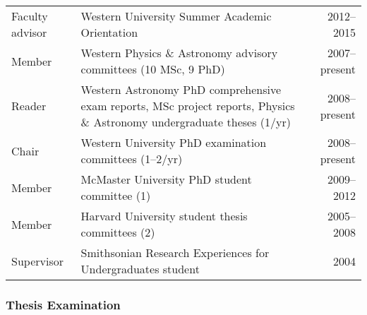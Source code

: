 \begin{tabularx}{\textwidth}{lXr}
Faculty advisor& Western University Summer Academic Orientation & 2012--2015\\
Member &Western Physics \& Astronomy advisory committees (10 MSc, 9 PhD) & 2007--present\\ %
Reader & Western Astronomy PhD comprehensive exam reports,  MSc project reports, Physics \& Astronomy undergraduate theses (1/yr) & 2008--present\\
Chair & Western University PhD examination committees (1--2/yr) & 2008--present\\
Member& McMaster University PhD student committee (1) & 2009--2012\\
Member& Harvard University student thesis committees (2) & 2005--2008\\
Supervisor& Smithsonian Research Experiences for Undergraduates student & 2004\\
\end{tabularx}

\vspace{0.5cm}
\subsubsection{Thesis Examination}

